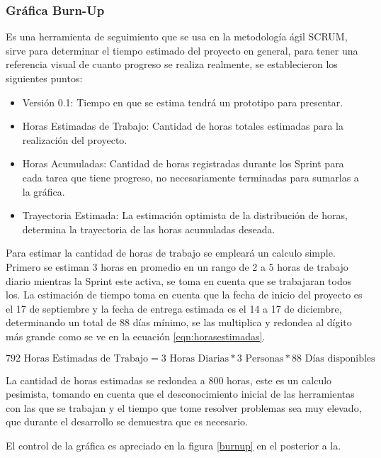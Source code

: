 \subsubsection{Gráfica Burn-Up}

Es una herramienta de seguimiento que se usa en la metodología ágil SCRUM, sirve para determinar el tiempo estimado del proyecto en general, para tener una referencia visual de cuanto progreso se realiza realmente, se establecieron los siguientes puntos:

\begin{itemize}
	\item Versión 0.1: Tiempo en que se estima tendrá un prototipo para presentar.
	\item Horas Estimadas de Trabajo: Cantidad de horas totales estimadas para la realización del proyecto.
	\item Horas Acumuladas: Cantidad de horas registradas durante los Sprint para cada tarea que tiene progreso, no necesariamente terminadas para sumarlas a la gráfica. 
	\item Trayectoria Estimada: La estimación optimista de la distribución de horas, determina la trayectoria de las horas acumuladas deseada.
\end{itemize}

Para estimar la cantidad de horas de trabajo se empleará un calculo simple.
 Primero se estiman 3 horas en promedio en un rango de 2 a 5 horas de trabajo diario mientras la Sprint este activa, se toma en cuenta que se trabajaran todos los. La estimación de tiempo toma en cuenta que la fecha de inicio del proyecto es el 17 de septiembre y la fecha de entrega estimada es el 14 a 17 de diciembre, determinando un total de 88 días mínimo, se las multiplica y redondea al dígito más grande como se ve en la ecuación \ref{eqn:horasestimadas}.
 
\begin{equation} 
\label{eqn:horasestimadas} 
	792 \text{ Horas Estimadas de Trabajo} = 3 \text{ Horas Diarias} * 3 \text{ Personas} * 88 \text{ Días disponibles}	
\end{equation}

La cantidad de horas estimadas se redondea a 800 horas, este es un calculo pesimista, tomando en cuenta que el desconocimiento inicial de las herramientas con las que se trabajan y el tiempo que tome resolver problemas sea muy elevado, que durante el desarrollo se demuestra que es necesario.

El control de la gráfica es apreciado en la figura \ref{burnup} en el  posterior a la.

